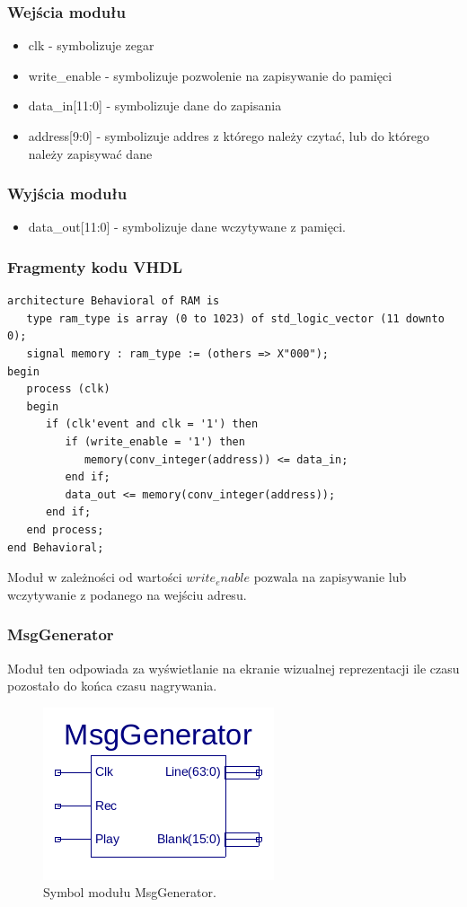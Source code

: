 \documentclass[a4paper,11pt]{article}
\begin{document}
\subsubsection*{Wejścia modułu}
\begin{itemize}
\item clk - symbolizuje zegar
\item write_enable - symbolizuje pozwolenie na zapisywanie do pamięci
\item data_in[11:0] - symbolizuje dane do zapisania
\item address[9:0] - symbolizuje addres z którego należy czytać, lub do którego należy zapisywać dane
\end{itemize}

\subsubsection*{Wyjścia modułu}
\begin{itemize}
\item data_out[11:0] - symbolizuje dane wczytywane z pamięci.
\end{itemize}

\subsubsection*{Fragmenty kodu VHDL}
\begin{lstlisting}
architecture Behavioral of RAM is
   type ram_type is array (0 to 1023) of std_logic_vector (11 downto 0);                 
   signal memory : ram_type := (others => X"000");
begin
   process (clk)
   begin
      if (clk'event and clk = '1') then
         if (write_enable = '1') then
            memory(conv_integer(address)) <= data_in;
         end if;
         data_out <= memory(conv_integer(address));
      end if;
   end process;
end Behavioral;
\end{lstlisting}
Moduł w zależności od wartości $write_enable$ pozwala na zapisywanie lub wczytywanie z podanego na wejściu adresu.

\subsubsection{MsgGenerator}
Moduł ten odpowiada za wyświetlanie na ekranie wizualnej reprezentacji ile czasu pozostało do końca czasu nagrywania.

\begin{figure}[H]
\center
\includegraphics[scale=0.8]{msggen.png}
\caption{Symbol modułu MsgGenerator.}
\end{figure}
\end{document}
